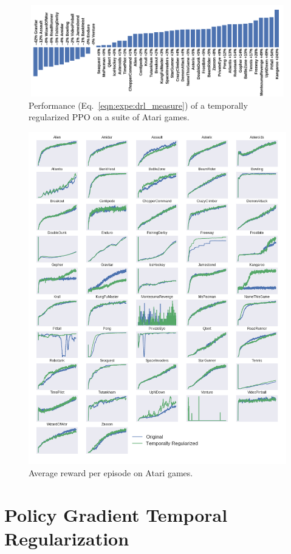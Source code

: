 \begin{figure}
    \centering
    \includegraphics[width=13cm,height=4cm]{fig/bar_atari.png}
    \caption{Performance (Eq.~\ref{eqn:expe:drl_measure}) of a temporally regularized PPO on a suite of Atari games.}
    \label{fig:graph_atari}
\end{figure}

\begin{figure}
    \centering
    \includegraphics[scale=0.5]{fig/plot_atari.png}
    \caption{Average reward per episode on Atari games.}
    \label{fig:my_label}
\end{figure}
\section{Policy Gradient Temporal Regularization}

